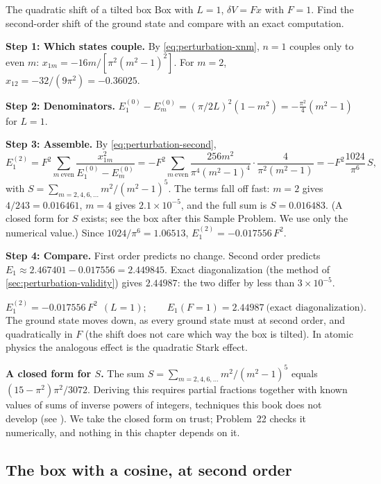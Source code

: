 \begin{sample}{The quadratic shift of a tilted box}
Box with $L=1$, $\delta V=Fx$ with $F=1$. Find the second-order shift of the ground state and compare with an exact computation.

\textbf{Step 1: Which states couple.} By \cref{eq:perturbation-xnm}, $n=1$ couples only to even $m$: $x_{1m}=-16m/[\pi^2(m^2-1)^2]$. For $m=2$, $x_{12}=-32/(9\pi^2)=-0.36025$.

\textbf{Step 2: Denominators.} $E_1^{(0)}-E_m^{(0)}=(\pi/2L)^2(1-m^2)=-\tfrac{\pi^2}{4}(m^2-1)$ for $L=1$.

\textbf{Step 3: Assemble.} By \cref{eq:perturbation-second},
\[
E_1^{(2)}=F^2\sum_{m\ \text{even}}\frac{x_{1m}^2}{E_1^{(0)}-E_m^{(0)}}
=-F^2\sum_{m\ \text{even}}\frac{256m^2}{\pi^4(m^2-1)^4}\cdot\frac{4}{\pi^2(m^2-1)}
=-F^2\frac{1024}{\pi^6}\,S,
\]
with $S=\sum_{m=2,4,6,\dots}m^2/(m^2-1)^5$. The terms fall off fast: $m=2$ gives $4/243=0.016461$, $m=4$ gives $2.1\times10^{-5}$, and the full sum is $S=0.016483$. (A closed form for $S$ exists; see the box after this Sample Problem. We use only the numerical value.) Since $1024/\pi^6=1.06513$, $E_1^{(2)}=-0.017556\,F^2$.

\textbf{Step 4: Compare.} First order predicts no change. Second order predicts $E_1\approx2.467401-0.017556=2.449845$. Exact diagonalization (the method of \cref{sec:perturbation-validity}) gives $2.44987$: the two differ by less than $3\times10^{-5}$.

\[
\boxed{E_1^{(2)}=-0.017556\,F^2\ \ (L=1);\qquad E_1(F{=}1)=2.44987\ \text{(exact diagonalization)}.}
\]
The ground state moves down, as every ground state must at second order, and quadratically in $F$ (the shift does not care which way the box is tilted). In atomic physics the analogous effect is the quadratic Stark effect.
\end{sample}

\begin{beyond}
\textbf{A closed form for $S$.} The sum $S=\sum_{m=2,4,6,\dots}m^2/(m^2-1)^5$ equals $(15-\pi^2)\pi^2/3072$. Deriving this requires partial fractions together with known values of sums of inverse powers of integers, techniques this book does not develop (see \cite{rhb}). We take the closed form on trust; Problem~22 checks it numerically, and nothing in this chapter depends on it.
\end{beyond}

\subsection{The box with a cosine, at second order}

